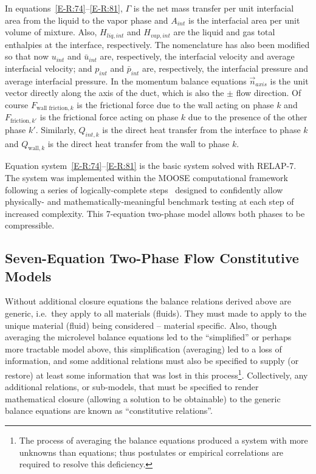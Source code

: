 In equations~\eqref{E-R:74}--\eqref{E-R:81}, $\Gamma$ is the net mass transfer per unit
interfacial area from the liquid to the vapor phase and $A_{int}$ is
the interfacial area per unit volume of mixture.  Also, $H_{liq, int}$
and $H_{vap, int}$ are the liquid and gas total enthalpies at the
interface, respectively.  The nomenclature has also been modified so
that now $u_{int}$ and $\bar{u}_{int}$ are, respectively, the
interfacial velocity and average interfacial velocity; and $p_{int}$
and $\bar{p}_{int}$ are, respectively, the interfacial pressure and
average interfacial pressure.  In the momentum balance equations
$\vec{n}_{axis}$ is the unit vector directly along the axis of the
duct, which is also the $\pm$ flow direction.  Of course
$F_{\text{wall friction}, k}$ is the frictional force due to the wall acting on phase
$k$ and $F_{\text{friction}, k'}$ is the frictional force acting on
phase $k$ due to the presence of the other phase $k'$.
Similarly, $Q_{int, k}$ is the direct heat transfer from the interface
to phase $k$ and $Q_{\text{wall}, k}$ is the direct heat transfer from
the wall to phase $k$.

Equation system~\eqref{E-R:74}--\eqref{E-R:81} is the basic system
solved with RELAP-7.  The system was implemented within the MOOSE
computational framework following a series of logically-complete
steps~\cite{Berry_2013} designed to confidently allow physically- and
mathematically-meaningful benchmark testing at each step of increased
complexity.  This 7-equation two-phase model allows both phases to be
compressible.

\subsection{Seven-Equation Two-Phase Flow Constitutive Models}
Without additional closure equations the balance relations derived
above are generic, i.e.\ they apply to all materials (fluids).  They
must made to apply to the unique material (fluid) being considered --
material specific.  Also, though averaging the microlevel
balance equations led to the ``simplified'' or perhaps more tractable
model above, this simplification (averaging) led to a loss of information,
and some additional relations must also be specified to supply (or
restore) at least some information that was lost in this
process\footnote{The process of averaging the balance equations produced a
system with more unknowns than equations; thus postulates or empirical
correlations are required to resolve this deficiency.}.  Collectively,
any additional relations, or sub-models, that must be specified to
render mathematical closure (allowing a solution to be obtainable) to
the generic balance equations are known as ``constitutive
relations''.

